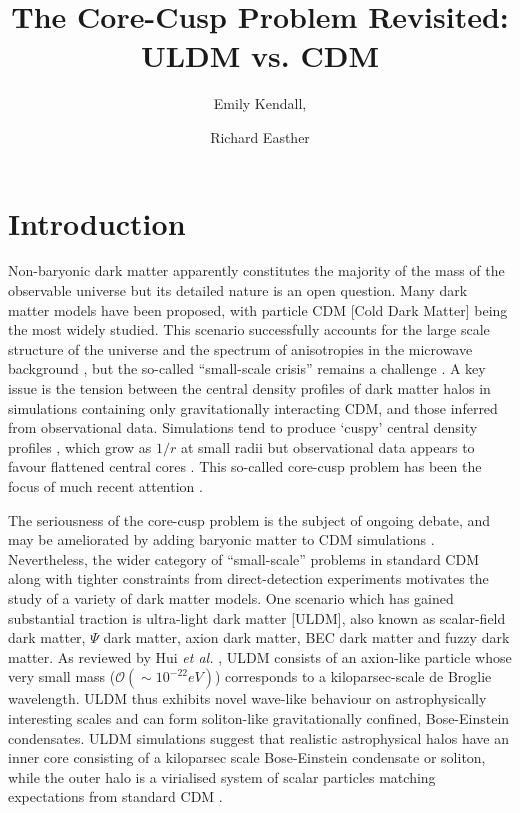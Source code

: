 \documentclass[a4paper,11pt]{article}
\title{\boldmath The Core-Cusp Problem Revisited: ULDM vs. CDM}
\author[1]{Emily Kendall,}
\author[1]{Richard Easther}
\affiliation[1]{Department of Physics, University of Auckland, Private Bag 92019, Auckland, New Zealand}
\begin{document}
\maketitle
\flushbottom


\section{Introduction}\label{sec:intro}

 
Non-baryonic dark matter apparently constitutes the majority of the mass of the observable universe but its detailed nature is an open question. Many dark matter models have been proposed, with particle CDM [Cold Dark Matter]  being the most widely studied. This scenario successfully accounts for the large scale structure of the universe \cite{Springel:2005nw} and the spectrum of anisotropies in the microwave background \cite{deBernardis:2000sbo, Hanany:2000qf, Halverson:2001yy, Netterfield:2001yq, Lee:2001yp, Ade:2015xua,  Hu:2001bc}, but the so-called ``small-scale crisis''  remains a challenge \cite{Weinberg:2013aya}. A key issue is the tension between the  central density profiles of dark matter halos in simulations containing only gravitationally interacting CDM, and those inferred from observational data. Simulations tend to produce `cuspy' central density profiles \cite{Navarro:1995iw}, which grow as $1/r$ at small radii but observational data appears to favour flattened central cores \cite{Moore:1994yx}. This so-called core-cusp problem has been the focus of much recent attention \cite{Dutton:2018nop, Read:2018pft, Genina:2018}. 
 
The seriousness of the core-cusp problem is the subject of ongoing debate, and may be ameliorated by adding baryonic matter to CDM simulations  \cite{Benitez-Llambay:2018}. Nevertheless,  the wider category of  ``small-scale'' problems in standard CDM along with tighter constraints from direct-detection experiments \cite{Schumann:2019eaa}  motivates the study of a variety of dark matter models. One scenario which has gained substantial traction is ultra-light dark matter [ULDM], also known as scalar-field dark matter, $\Psi$ dark matter, axion dark matter, BEC dark matter and fuzzy dark matter. As reviewed by Hui {\em et al.\/} \cite{Hui:2016ltb}, ULDM consists of an axion-like particle whose very small mass  ($\mathcal{O}(\sim 10^{-22}eV)$) corresponds to a kiloparsec-scale de Broglie wavelength. ULDM thus exhibits novel wave-like behaviour on astrophysically interesting scales and can form soliton-like gravitationally confined, Bose-Einstein condensates. ULDM simulations suggest that realistic astrophysical halos have an inner core consisting of a kiloparsec scale Bose-Einstein condensate or soliton, while the outer halo is a virialised system of scalar particles  matching expectations from standard CDM \cite{Schwabe:2016rze, Veltmaat:2018dfz}. 
\end{document}
